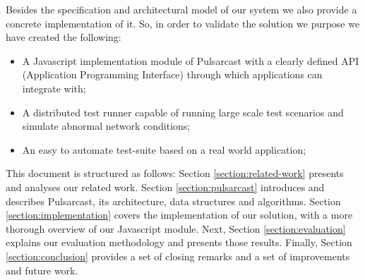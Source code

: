 Besides the specification and architectural model of our system we also provide
a concrete implementation of it. So, in order to validate the solution we
purpose we have created the following:

\begin{itemize}
  \item
    A Javascript implementation module of Pulsarcast with a clearly defined API (Application Programming Interface) through which applications can integrate with;
  \item
    A distributed test runner capable of running large scale test scenarios and simulate abnormal network conditions;
  \item
    An easy to automate test-suite based on a real world application;
\end{itemize}

This document is structured as follows: Section \ref{section:related-work}
presents and analyses our related work. Section \ref{section:pulsarcast}
introduces and describes Pulsarcast, its architecture, data structures and
algorithms. Section \ref{section:implementation} covers the implementation of
our solution, with a more thorough overview of our Javascript module. Next,
Section \ref{section:evaluation} explains our evaluation methodology and
presents those results. Finally, Section \ref{section:conclusion} provides a
set of closing remarks and a set of improvements and future work.
